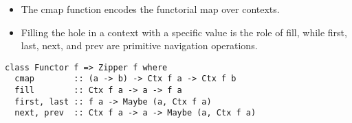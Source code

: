 \begin{itemize}
  \item The cmap function encodes the functorial map over contexts. 
  \item Filling the hole in a context with a specific value is the role of fill, while first, last, next, and prev are primitive navigation operations.
\end{itemize}

\begin{verbatim}
class Functor f => Zipper f where
  cmap        :: (a -> b) -> Ctx f a -> Ctx f b
  fill        :: Ctx f a -> a -> f a
  first, last :: f a -> Maybe (a, Ctx f a)
  next, prev  :: Ctx f a -> a -> Maybe (a, Ctx f a)
\end{verbatim}